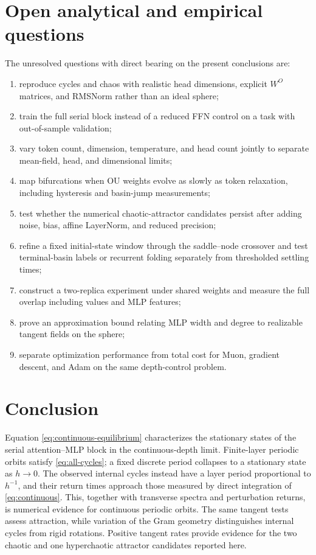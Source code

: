 \documentclass[11pt,a4paper]{article}
\theoremstyle{definition}
\begin{document}
\section{Open analytical and empirical questions}
\label{sec:limits}

The unresolved questions with direct bearing on the present conclusions are:
\begin{enumerate}
  \item reproduce cycles and chaos with realistic head dimensions, explicit $W^O$
  matrices, and RMSNorm rather than an ideal sphere;
  \item train the full serial block instead of a reduced FFN control on a task with
  out-of-sample validation;
  \item vary token count, dimension, temperature, and head count jointly to separate
  mean-field, head, and dimensional limits;
  \item map bifurcations when OU weights evolve as slowly as token relaxation, including
  hysteresis and basin-jump measurements;
  \item test whether the numerical chaotic-attractor candidates persist after adding noise, bias,
  affine LayerNorm, and reduced precision;
  \item refine a fixed initial-state window through the saddle--node crossover and
  test terminal-basin labels or recurrent folding separately from thresholded
  settling times;
  \item construct a two-replica experiment under shared weights and measure the full
  overlap including values and MLP features;
  \item prove an approximation bound relating MLP width and degree to realizable
  tangent fields on the sphere;
  \item separate optimization performance from total cost for Muon, gradient descent,
  and Adam on the same depth-control problem.
\end{enumerate}

\section{Conclusion}

Equation \eqref{eq:continuous-equilibrium} characterizes the stationary states of the
serial attention--MLP block in the continuous-depth limit. Finite-layer periodic
orbits satisfy \eqref{eq:all-cycles}; a fixed discrete period collapses to a stationary
state as $h\to0$. The observed internal cycles instead have a layer period proportional
to $h^{-1}$, and their return times approach those measured by direct integration of
\eqref{eq:continuous}.  This, together with transverse spectra and perturbation
returns, is numerical evidence for continuous periodic orbits.  The same tangent
tests assess attraction, while variation of the Gram geometry distinguishes internal
cycles from rigid rotations.  Positive tangent rates provide evidence for the two
chaotic and one hyperchaotic attractor candidates reported here.
\end{document}
